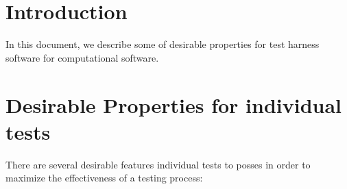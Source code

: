 \documentclass[pdf,ps2pdf,11pt]{SANDreport}
\begin{document}

%


\SANDmain %


%
{}\section{Introduction}
%

In this document, we describe some of desirable properties for test
harness software for computational software.


%
{}\section{Desirable Properties for individual tests}
%

There are several desirable features individual tests to posses in
order to maximize the effectiveness of a testing process:
\end{document}

